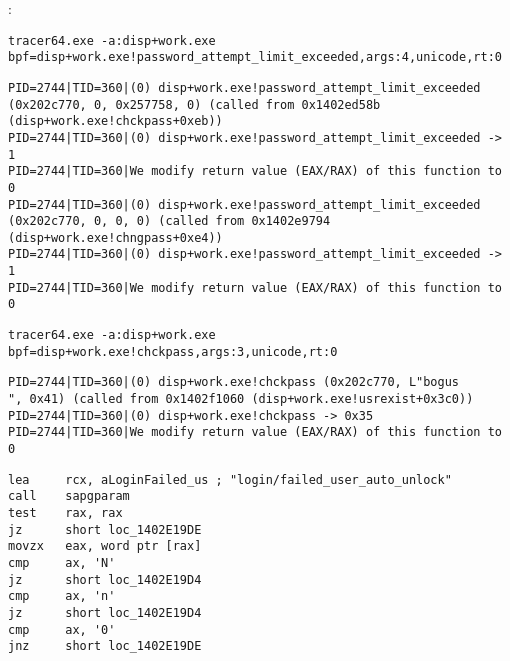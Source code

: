 :

\begin{lstlisting}
tracer64.exe -a:disp+work.exe bpf=disp+work.exe!password_attempt_limit_exceeded,args:4,unicode,rt:0
\end{lstlisting}

\begin{lstlisting}
PID=2744|TID=360|(0) disp+work.exe!password_attempt_limit_exceeded (0x202c770, 0, 0x257758, 0) (called from 0x1402ed58b (disp+work.exe!chckpass+0xeb))
PID=2744|TID=360|(0) disp+work.exe!password_attempt_limit_exceeded -> 1
PID=2744|TID=360|We modify return value (EAX/RAX) of this function to 0
PID=2744|TID=360|(0) disp+work.exe!password_attempt_limit_exceeded (0x202c770, 0, 0, 0) (called from 0x1402e9794 (disp+work.exe!chngpass+0xe4))
PID=2744|TID=360|(0) disp+work.exe!password_attempt_limit_exceeded -> 1
PID=2744|TID=360|We modify return value (EAX/RAX) of this function to 0
\end{lstlisting}



\begin{lstlisting}
tracer64.exe -a:disp+work.exe bpf=disp+work.exe!chckpass,args:3,unicode,rt:0
\end{lstlisting}

\begin{lstlisting}
PID=2744|TID=360|(0) disp+work.exe!chckpass (0x202c770, L"bogus                                   ", 0x41) (called from 0x1402f1060 (disp+work.exe!usrexist+0x3c0))
PID=2744|TID=360|(0) disp+work.exe!chckpass -> 0x35
PID=2744|TID=360|We modify return value (EAX/RAX) of this function to 0
\end{lstlisting}


\begin{lstlisting}
lea     rcx, aLoginFailed_us ; "login/failed_user_auto_unlock"
call    sapgparam
test    rax, rax
jz      short loc_1402E19DE
movzx   eax, word ptr [rax]
cmp     ax, 'N'
jz      short loc_1402E19D4
cmp     ax, 'n'
jz      short loc_1402E19D4
cmp     ax, '0'
jnz     short loc_1402E19DE
\end{lstlisting}

